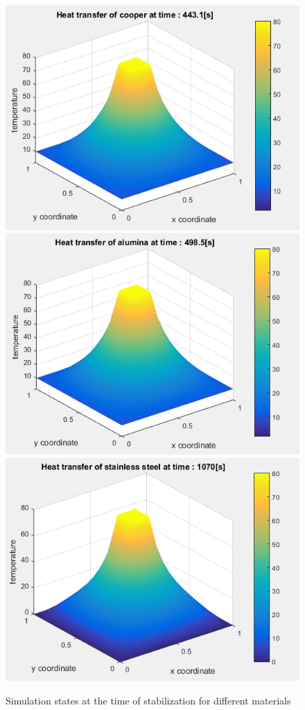 \documentclass[a4paper,12pt]{article}
\begin{document}
\begin{figure}[H]
\includegraphics[scale=0.55]{1_cooper}
\includegraphics[scale=0.55]{1_alumina}
\includegraphics[scale=0.55]{1_steel}
\caption{Simulation states at the time of stabilization for different materials}
\centering
\end{figure}
\end{document}
